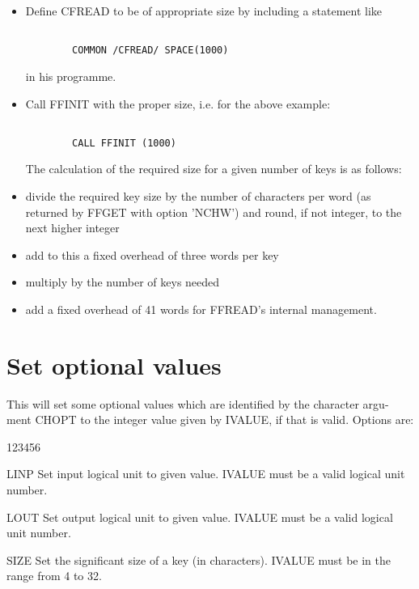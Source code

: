 \begin{itemize}
\item
Define CFREAD to be of appropriate size by including a statement like

\begin{verbatim}
 
        COMMON /CFREAD/ SPACE(1000)

\end{verbatim}
 
in his programme.
 
\item
Call FFINIT with the proper size, i.e. for the above example:
 
\begin{verbatim}

        CALL FFINIT (1000)

\end{verbatim}
 
The calculation of the required size for a given number of keys is as follows:
 
\item
divide the required key size by the number of characters per word
(as returned by FFGET with option 'NCHW') and round, if not integer, to
the next higher integer
\item
add to this a fixed overhead of three words per key
\item
multiply by the number of keys needed
\item
add a fixed overhead of 41 words for FFREAD's internal management.
\end{itemize}
 
 
\section{Set optional values}
 
 
This will set some optional values which are identified by the character argu-
ment CHOPT to the integer value given by IVALUE, if that is valid. Options are:
\begin{DLtt}{123456}
\item[LINP]Set input  logical unit to given value. IVALUE must be
           a valid logical unit number.
\item[LOUT]Set output logical unit to given value. IVALUE must be
           a valid logical unit number.
\item[SIZE]Set the significant size of a key (in characters).
           IVALUE must be in the range from 4 to 32.
\end{DLtt}
 
